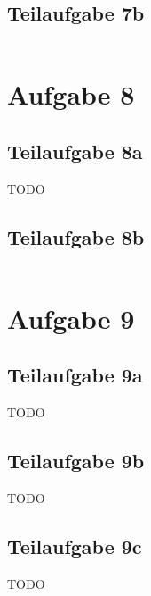 \documentclass[a4paper]{scrartcl}
\begin{document}
\subsection*{Teilaufgabe 7b}
\inputminted[linenos, numbersep=5pt, tabsize=4, frame=lines, label=7b.cpp]{cpp}{7b.cpp}

\section*{Aufgabe 8}
\subsection*{Teilaufgabe 8a}
TODO

\subsection*{Teilaufgabe 8b}
\inputminted[linenos, numbersep=5pt, tabsize=4, frame=lines, label=shader.frag]{glsl}{shader.frag}

\section*{Aufgabe 9}
\subsection*{Teilaufgabe 9a}
TODO
\subsection*{Teilaufgabe 9b}
TODO
\subsection*{Teilaufgabe 9c}
TODO
\end{document}
